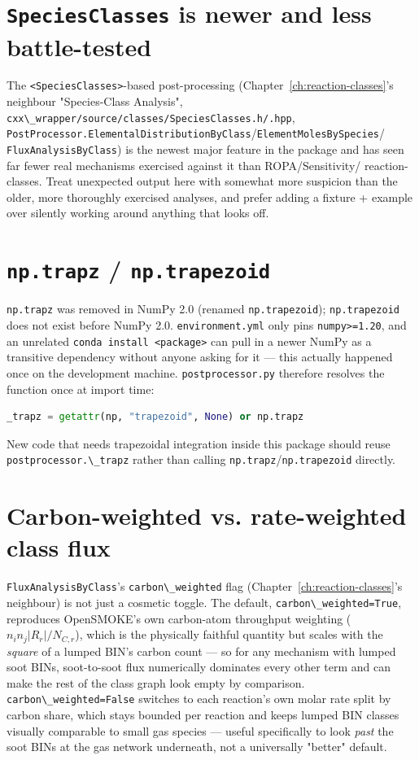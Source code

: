 \documentclass[11pt,a4paper]{report}
\newcommand{\pkg}[1]{\lstinline|#1|}
\begin{document}
\section{\texttt{SpeciesClasses} is newer and less battle-tested}

The \pkg{<SpeciesClasses>}-based post-processing
(Chapter~\ref{ch:reaction-classes}'s neighbour "Species-Class Analysis",
\pkg{cxx\_wrapper/source/classes/SpeciesClasses.h/.hpp},
\pkg{PostProcessor.ElementalDistributionByClass}/\pkg{ElementMolesBySpecies}/
\pkg{FluxAnalysisByClass}) is the newest major feature in the package and has
seen far fewer real mechanisms exercised against it than ROPA/Sensitivity/
reaction-classes. Treat unexpected output here with somewhat more suspicion
than the older, more thoroughly exercised analyses, and prefer adding a
fixture + example over silently working around anything that looks off.

\section{\texttt{np.trapz} / \texttt{np.trapezoid}}

\pkg{np.trapz} was removed in NumPy 2.0 (renamed \pkg{np.trapezoid});
\pkg{np.trapezoid} does not exist before NumPy 2.0.
\pkg{environment.yml} only pins \pkg{numpy>=1.20}, and an unrelated
\pkg{conda install <package>} can pull in a newer NumPy as a transitive
dependency without anyone asking for it --- this actually happened once on
the development machine. \pkg{postprocessor.py} therefore resolves the
function once at import time:
\begin{lstlisting}[language=Python]
_trapz = getattr(np, "trapezoid", None) or np.trapz
\end{lstlisting}
New code that needs trapezoidal integration inside this package should reuse
\pkg{postprocessor.\_trapz} rather than calling \pkg{np.trapz}/\pkg{np.trapezoid}
directly.

\section{Carbon-weighted vs. rate-weighted class flux}

\pkg{FluxAnalysisByClass}'s \pkg{carbon\_weighted} flag (Chapter~\ref{ch:reaction-classes}'s
neighbour) is not just a cosmetic toggle. The default,
\pkg{carbon\_weighted=True}, reproduces OpenSMOKE's own carbon-atom
throughput weighting ($n_i n_j |R_r| / N_{C,r}$), which is the physically
faithful quantity but scales with the \emph{square} of a lumped BIN's carbon
count --- so for any mechanism with lumped soot BINs, soot-to-soot flux
numerically dominates every other term and can make the rest of the class
graph look empty by comparison. \pkg{carbon\_weighted=False} switches to each
reaction's own molar rate split by carbon share, which stays bounded per
reaction and keeps lumped BIN classes visually comparable to small gas
species --- useful specifically to look \emph{past} the soot BINs at the gas
network underneath, not a universally "better" default.
\end{document}
